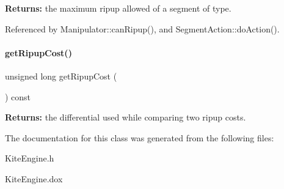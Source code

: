 {\bfseries Returns\+:} the maximum ripup allowed of a segment of {\ttfamily type}. 

Referenced by Manipulator\+::can\+Ripup(), and Segment\+Action\+::do\+Action().

\mbox{\label{classKite_1_1KiteEngine_a1b4de41d8359251bcfbda288ec6bbbee}} 
\paragraph{\texorpdfstring{get\+Ripup\+Cost()}{getRipupCost()}}
{\footnotesize\ttfamily unsigned long get\+Ripup\+Cost (\begin{DoxyParamCaption}{ }\end{DoxyParamCaption}) const\hspace{0.3cm}{\ttfamily [inline]}}

{\bfseries Returns\+:} the differential used while comparing two ripup costs. 

The documentation for this class was generated from the following files\+:\begin{DoxyCompactItemize}
\item 
Kite\+Engine.\+h\item 
Kite\+Engine.\+dox\end{DoxyCompactItemize}
